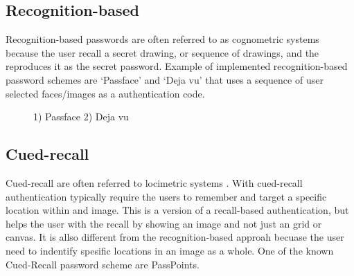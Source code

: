         
    \subsection*{Recognition-based}
      Recognition-based passwords are often referred to as cognometric systems \cite{DeAngeli} because the user recall 
      a secret drawing, or sequence of drawings, and the reproduces it as the secret password. Example of implemented 
      recognition-based password schemes are `Passface' and `Deja vu' that uses a sequence of user selected faces/images as a authentication code.

      \begin{figure}[H]
        \centering
        \caption{1) Passface 2) Deja vu}
      \end{figure}

    \subsection*{Cued-recall}
      Cued-recall are often referred to locimetric systems \cite{DeAngeli}. With cued-recall authentication typically 
      require the users to remember and target a specific location within and image. This is a version of a recall-based 
      authentication, but helps the user with the recall by showing an image and not just an grid or canvas. It is allso 
      different from the recognition-based approah becuase the user need to indentify spesific locations in an image as a whole. 
      One of the known Cued-Recall password scheme are PassPoints.

